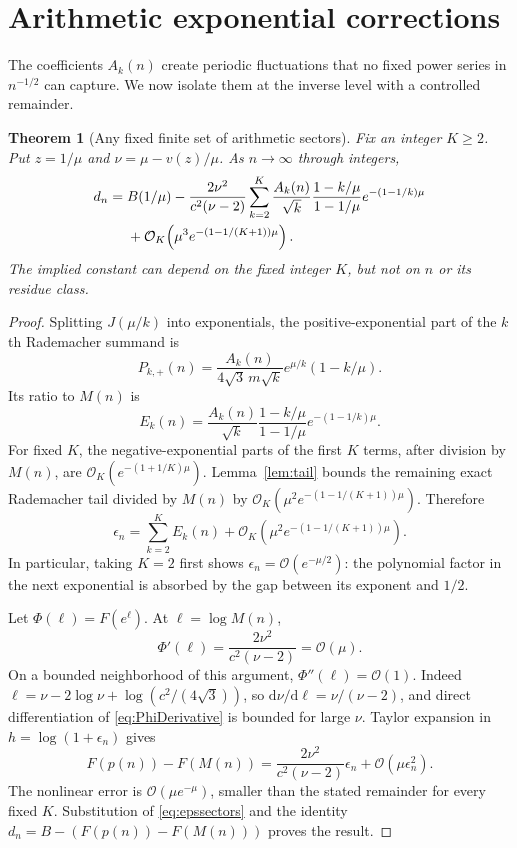 \documentclass[11pt]{article}
\numberwithin{equation}{section}
\newtheorem{theorem}{Theorem}[section]
\theoremstyle{definition}
\theoremstyle{remark}
\newcommand{\OO}{\mathcal O}
\newcommand{\dd}{\mathrm d}
\begin{document}
\section{Arithmetic exponential corrections}\label{sec:arithmetic}
The coefficients $A_k(n)$ create periodic fluctuations that no fixed
power series in $n^{-1/2}$ can capture. We now isolate them at the
inverse level with a controlled remainder.

\begin{theorem}[Any fixed finite set of arithmetic sectors]\label{thm:sectors}
Fix an integer $K\ge2$. Put $z=1/\mu$ and
$\nu=\mu-v(z)/\mu$. As $n\to\infty$ through integers,
\begin{align}
 d_n={}&B(1/\mu)
 -\frac{2\nu^2}{c^2(\nu-2)}
 \sum_{k=2}^K\frac{A_k(n)}{\sqrt k}
   \frac{1-k/\mu}{1-1/\mu}
   e^{-(1-1/k)\mu}\notag\\
 &+\OO_K\!\left(\mu^3
       e^{-(1-1/(K+1))\mu}\right).
 \label{eq:sectors}
\end{align}
The implied constant can depend on the fixed integer $K$, but not on
$n$ or its residue class.
\end{theorem}
\begin{proof}
Splitting $J(\mu/k)$ into exponentials, the positive-exponential part
of the $k$th Rademacher summand is
\[
 P_{k,+}(n)=\frac{A_k(n)}{4\sqrt3\,m\sqrt k}
 e^{\mu/k}(1-k/\mu).
\]
Its ratio to $M(n)$ is
\begin{equation}\label{eq:sectorratio}
 E_k(n)=\frac{A_k(n)}{\sqrt k}
 \frac{1-k/\mu}{1-1/\mu}e^{-(1-1/k)\mu}.
\end{equation}
For fixed $K$, the negative-exponential parts of the first $K$ terms,
after division by $M(n)$, are
$\OO_K(e^{-(1+1/K)\mu})$. Lemma~\ref{lem:tail} bounds the remaining
exact Rademacher tail divided by $M(n)$ by
$\OO_K(\mu^2e^{-(1-1/(K+1))\mu})$. Therefore
\begin{equation}\label{eq:epssectors}
 \epsilon_n=\sum_{k=2}^K E_k(n)
 +\OO_K(\mu^2e^{-(1-1/(K+1))\mu}).
\end{equation}
In particular, taking $K=2$ first shows
$\epsilon_n=\OO(e^{-\mu/2})$: the polynomial factor in the next
exponential is absorbed by the gap between its exponent and $1/2$.

Let $\Phi(\ell)=F(e^\ell)$. At $\ell=\log M(n)$,
\begin{equation}\label{eq:PhiDerivative}
 \Phi'(\ell)=\frac{2\nu^2}{c^2(\nu-2)}=\OO(\mu).
\end{equation}
On a bounded neighborhood of this argument, $\Phi''(\ell)=\OO(1)$.
Indeed $\ell=\nu-2\log\nu+\log(c^2/(4\sqrt3))$,
so $\dd\nu/\dd\ell=\nu/(\nu-2)$, and direct differentiation of
\eqref{eq:PhiDerivative} is bounded for large $\nu$.
Taylor expansion in $h=\log(1+\epsilon_n)$ gives
\[
 F(p(n))-F(M(n))
 =\frac{2\nu^2}{c^2(\nu-2)}\epsilon_n
 +\OO(\mu\epsilon_n^2).
\]
The nonlinear error is $\OO(\mu e^{-\mu})$, smaller than the stated
remainder for every fixed $K$. Substitution of \eqref{eq:epssectors}
and the identity $d_n=B-(F(p(n))-F(M(n)))$ proves the result.
\end{proof}
\end{document}
